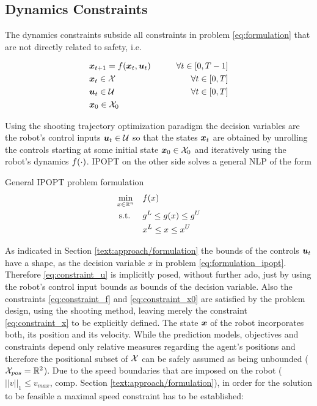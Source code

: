 \subsection{Dynamics Constraints}
\label{text:approach/constraint/dynamics}
The dynamics constraints subside all constraints in problem \ref{eq:formulation} that are not directly related to safety, i.e. 

\begin{align}
\label{eq:constraint_f}
&\boldsymbol{x}_{t+1} = f(\boldsymbol{x}_t, \boldsymbol{u}_t) \qquad& \forall t \in [0, T - 1] \\
\label{eq:constraint_x}
&\boldsymbol{x}_t \in \mathcal{X} & \forall t \in [0, T]\\
\label{eq:constraint_u}
&\boldsymbol{u}_t \in \mathcal{U} & \forall t \in [0, T]\\
\label{eq:constraint_x0}
&\boldsymbol{x}_0 \in \mathcal{X}_0
\end{align}

Using the shooting trajectory optimization paradigm the decision variables are the robot's control inputs  $\boldsymbol{u}_t \in \mathcal{U}$ so that the states $\boldsymbol{x}_t$ are obtained by unrolling the controls starting at some initial state $\boldsymbol{x}_0 \in \mathcal{X}_0$ and iteratively using the robot's dynamics $f(\cdot)$. \ac{IPOPT} on the other side solves a general \ac{NLP} of the form \cite{Wachter2006} \\

\begin{problem}{General IPOPT problem formulation}
\begin{align}
\min_{x \in \mathbb{R}^n} \quad & f(x) \\
\textrm{s.t. } \quad & g^L \leq g(x) \leq g^U \\
& x^L \leq x \leq x^U 
\end{align}
\label{eq:formulation_ipopt}
\end{problem}

As indicated in Section \ref{text:approach/formulation} the bounds of the controls $\boldsymbol{u}_t$ have a shape, as the decision variable $x$ in problem \ref{eq:formulation_ipopt}. Therefore \ref{eq:constraint_u} is implicitly posed, without further ado, just by using the robot's control input bounds as bounds of the decision variable. Also the constraints \ref{eq:constraint_f} and  \ref{eq:constraint_x0} are satisfied by the problem design, using the shooting method, leaving merely the constraint \ref{eq:constraint_x} to be explicitly defined. The state $\boldsymbol{x}$ of the robot incorporates both, its position and its velocity. While the prediction models, objectives and constraints depend only  relative measures regarding the agent's positions and therefore the positional subset of $\mathcal{X}$ can be safely assumed as being unbounded ($\mathcal{X}_{pos} = \mathbb{R}^2$). Due to the speed boundaries that are imposed on the robot ($||v||_1 \leq v_{max}$, comp. Section \ref{text:approach/formulation}), in order for the solution to be feasible a maximal speed constraint has to be established:

